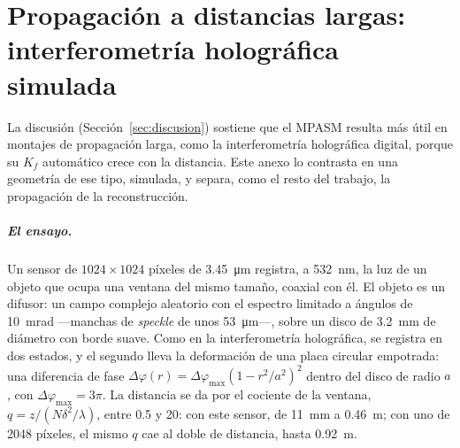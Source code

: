 \chapter{Propagación a distancias largas: interferometría holográfica simulada}
\label{anx:larga}

La discusión (Sección~\ref{sec:discusion}) sostiene que el MPASM resulta más
útil en montajes de propagación larga, como la interferometría holográfica
digital, porque su $K_f$ automático crece con la distancia. Este anexo lo
contrasta en una geometría de ese tipo, simulada, y separa, como el resto del
trabajo, la propagación de la reconstrucción.

\paragraph{El ensayo.} Un sensor de $1024\times1024$ píxeles de
\SI{3.45}{\micro\metre} registra, a \SI{532}{nm}, la luz de un objeto que
ocupa una ventana del mismo tamaño, coaxial con él. El objeto es un difusor:
un campo complejo aleatorio con el espectro limitado a ángulos de
\SI{10}{mrad} ---manchas de \emph{speckle} de unos \SI{53}{\micro\metre}---,
sobre un disco de \SI{3.2}{mm} de diámetro con borde suave. Como en la
interferometría holográfica, se registra en dos estados, y el segundo lleva la
deformación de una placa circular empotrada: una diferencia de fase
$\Delta\varphi(r) = \Delta\varphi_\mathrm{max}(1 - r^2/a^2)^2$ dentro del
disco de radio $a$, con $\Delta\varphi_\mathrm{max} = 3\pi$. La distancia se
da por el cociente de la ventana, $q = z/(N\delta^2/\lambda)$, entre 0.5 y 20:
con este sensor, de \SI{11}{mm} a \SI{0.46}{m}; con uno de 2048 píxeles, el
mismo $q$ cae al doble de distancia, hasta \SI{0.92}{m}.

